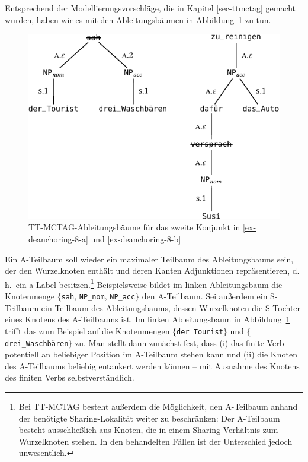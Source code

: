 Entsprechend der Modellierungsvorschläge, die in Kapitel \ref{sec-ttmctag} gemacht wurden, haben wir es mit den Ableitungsbäumen in Abbildung~\ref{fig-deanchoring-10} zu tun. 
\begin{figure}[t]
\centering
\includegraphics{graphics/abb826.pdf}
\caption{\label{fig-deanchoring-10}TT-MCTAG-Ableitungsbäume für das zweite Konjunkt in \ref{ex-deanchoring-8-a} und \ref{ex-deanchoring-8-b}}
\end{figure}
Ein A-Teilbaum soll wieder ein maximaler Teilbaum des Ableitungsbaums sein, der den Wurzelknoten enthält und deren Kanten Adjunktionen repräsentieren, d.\,h.\ ein {\sc a}-Label besitzen.\footnote{Bei TT-MCTAG besteht außerdem die Möglichkeit, den A-Teilbaum  anhand der benötigte Sharing-Lokalität weiter zu beschränken: Der A-Teilbaum besteht ausschlie\ss lich aus Knoten, die in einem Sharing-Verhältnis zum Wurzelknoten stehen. In den behandelten Fällen ist der Unterschied jedoch unwesentlich.} Beispielsweise bildet im linken Ableitungsbaum die Knotenmenge $\{${\tt sah}, {\tt NP\_nom}, {\tt NP\_acc}$\}$ den A-Teilbaum. Sei au\ss erdem ein S-Teilbaum ein Teilbaum des Ableitungsbaums, dessen Wurzelknoten die S-Tochter eines Knotens des A-Teilbaums ist. Im linken Ableitungsbaum in Abbildung~\ref{fig-deanchoring-10} trifft das zum Beispiel auf die Knotenmengen $\{${\tt der\_Tourist}$\}$ und $\{${\tt drei\_Waschbären}$\}$ zu. Man stellt dann zunächst fest, dass (i) das finite Verb potentiell an beliebiger Position im A-Teilbaum stehen kann und (ii) die Knoten des A-Teilbaums beliebig entankert werden können -- mit Ausnahme des Knotens des finiten Verbs selbstverständlich. 


